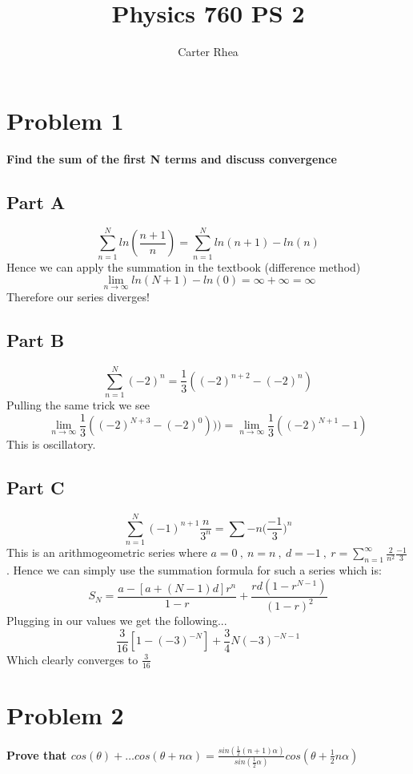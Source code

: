 \documentclass[10pt,a4paper]{article}
\author{Carter Rhea}
\title{Physics 760 PS 2}
\begin{document}
	\maketitle
	\section{Problem 1}
	\textbf{Find the sum of the first N terms and discuss convergence}
	\subsection{Part A}
	\begin{equation}
	\nonumber
		\sum_{n=1}^N ln(\frac{n+1}{n}) = \sum_{n=1}^{N} ln(n+1)-ln(n)
	\end{equation}
	Hence we can apply the summation in the textbook (difference method)
	$$\lim_{n\to\infty}ln(N+1)-ln(0)  = \infty + \infty = \infty $$
	Therefore our series diverges!
	
	\subsection{Part B}
	\begin{equation}
		\nonumber
			\sum_{n=1}^N (-2)^n = \frac{1}{3}((-2)^{n+2}-(-2)^n)
	\end{equation}
	Pulling the same trick we see
	$$\lim_{n\to\infty}\frac{1}{3}((-2)^{N+3}-(-2)^0))) = \lim_{n\to\infty}\frac{1}{3}((-2)^{N+1}-1) $$
	This is oscillatory.
	\subsection{Part C}
	\begin{equation}
	\nonumber
	\sum_{n=1}^N (-1)^{n+1}\frac{n}{3^n} = \sum -n\Big(\frac{-1}{3}\Big)^n
	\end{equation}
	This is an arithmogeometric series where $a=0 \ , \ n = n \ , \ d = -1 \ , \ r=\sum_{n=1}^\infty \frac{2}{n^2} \frac{-1}{3}$. Hence we can simply use the summation formula for such a series which is:
	$$S_N = \frac{a-[a+(N-1)d]r^n}{1-r} + \frac{rd(1-r^{N-1})}{(1-r)^2}$$
	Plugging in our values we get the following...
	$$\frac{3}{16}[1-(-3)^{-N}]+\frac{3}{4}N(-3)^{-N-1} $$
	Which clearly converges to $\frac{3}{16}$
	\newpage
	
	\section{Problem 2}
	\textbf{Prove that $cos(\theta)+ \dots cos(\theta+n\alpha) = \frac{sin(\frac{1}{2}(n+1)\alpha)}{sin(\frac{1}{2}\alpha)}cos(\theta+\frac{1}{2}n\alpha)$}
	
\end{document}

